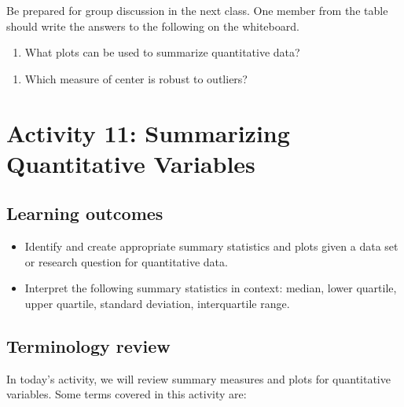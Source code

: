 \documentclass[
]{report}
\providecommand{\tightlist}{%
  \setlength{\itemsep}{0pt}\setlength{\parskip}{0pt}}
\begin{document}
Be prepared for group discussion in the next class. One member from the table should write the answers to the following on the whiteboard.

\begin{enumerate}
\def\labelenumi{\arabic{enumi}.}
\tightlist
\item
  What plots can be used to summarize quantitative data?
\end{enumerate}

\vspace{0.7in}

\begin{enumerate}
\def\labelenumi{\arabic{enumi}.}
\setcounter{enumi}{1}
\tightlist
\item
  Which measure of center is robust to outliers?
\end{enumerate}

\vspace{0.2in}

\newpage

\section{Activity 11: Summarizing Quantitative Variables}\label{activity-11-summarizing-quantitative-variables}


\subsection{Learning outcomes}\label{learning-outcomes-11}

\begin{itemize}
\item
  Identify and create appropriate summary statistics and plots given a data set or research question for quantitative data.
\item
  Interpret the following summary statistics in context:
  median, lower quartile, upper quartile,
  standard deviation, interquartile range.
\end{itemize}

\subsection{Terminology review}\label{terminology-review-9}

In today's activity, we will review summary measures and plots for quantitative variables. Some terms covered in this activity are:
\end{document}
